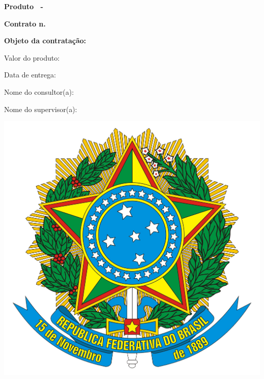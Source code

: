 \addtolength{\topmargin}{2.5cm}
\thispagestyle{empty}
{\color{MidnightBlue}

{\bf \LARGE Produto \ProductNumber\ -\ \ProductTitle}

\hrulefill

\vspace{1cm}

\begin{center}

{\bf \large Contrato n. \ContractNumber}

\vspace{1.5cm}

{\bf \large Objeto da contratação: \ObjetoContratacao}

\end{center}

\vspace{3.2cm}

Valor do produto: \ProductValue

\vspace{1.2cm}

Data de entrega: \DataEntrega

\vspace{1.2cm}

Nome do consultor(a): \MyName

\vspace{1.2cm}

Nome do supervisor(a): \SupervisorName

}

\vspace{2cm}

\begin{center}
\includegraphics[scale=0.04]{brasao.png} \\
{\bf \small \NomeSecretaria}
\end{center}

\restoregeometry
\newpage
